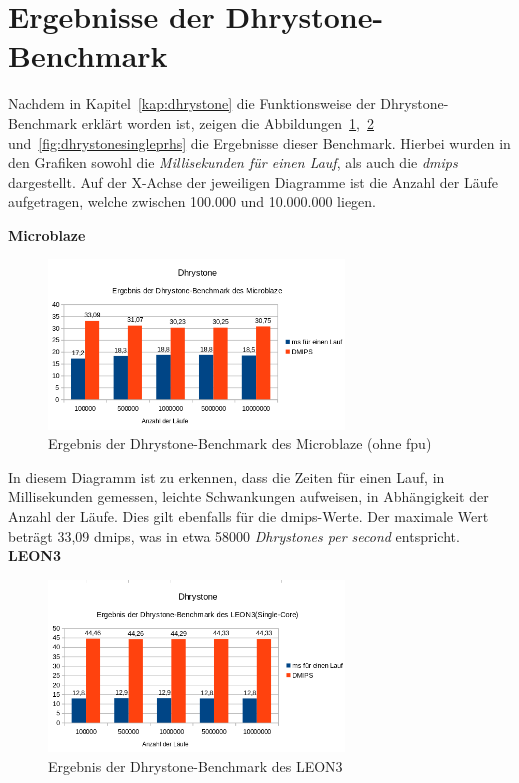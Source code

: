 \section{Ergebnisse der Dhrystone-Benchmark}\label{kap:dhrystonetest}

Nachdem in Kapitel~\ref{kap:dhrystone} die Funktionsweise der Dhrystone-Benchmark erklärt worden ist, zeigen die Abbildungen~\ref{fig:dhrystonembohnefpu},~\ref{fig:dhrystonesingleleon3} und~\ref{fig:dhrystonesingleprhs} die Ergebnisse
dieser Benchmark. Hierbei wurden in den Grafiken sowohl die \emph{Millisekunden für einen Lauf}, als auch die \emph{\ac{dmips}} dargestellt. Auf der X-Achse der jeweiligen Diagramme ist die Anzahl
der Läufe aufgetragen, welche zwischen 100.000 und 10.000.000 liegen.\\
\newpage

\textbf{Microblaze}

\begin{figure}[H]
\centering
\includegraphics[width=0.7\textwidth]{Hauptteil/dhrystonembohnefpu.png}
\caption{Ergebnis der Dhrystone-Benchmark des Microblaze (ohne \ac{fpu})}
\label{fig:dhrystonembohnefpu}
\end{figure}

In diesem Diagramm ist zu erkennen, dass die Zeiten für einen Lauf, in Millisekunden gemessen, leichte Schwankungen aufweisen, in Abhängigkeit der Anzahl der Läufe. Dies gilt ebenfalls für
die \ac{dmips}-Werte. Der maximale Wert beträgt 33,09 \ac{dmips}, was in etwa 58000 \emph{Dhrystones per second} entspricht.\\

\textbf{LEON3}

\begin{figure}[H]
\centering
\includegraphics[width=0.7\textwidth]{Hauptteil/dhrystonesingleleon3.png}
\caption{Ergebnis der Dhrystone-Benchmark des LEON3}
\label{fig:dhrystonesingleleon3}
\end{figure}

